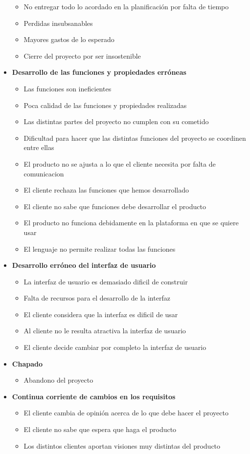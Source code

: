\documentclass[spanish,a4paper,12pt]{report}	%
\begin{document}
\begin{itemize}
\begin{itemize}
		\item {No entregar todo lo acordado en la planificación por falta de tiempo}
		\item {Perdidas insubsanables}
		\item {Mayores gastos de lo esperado}
		\item {Cierre del proyecto por ser insostenible}
	\end{itemize}
\item \textbf {Desarrollo de las funciones y propiedades erróneas}
	\begin{itemize}
		\item {Las funciones son ineficientes}
		\item {Poca calidad de las funciones y propiedades realizadas}
		\item {Las distintas partes del proyecto no cumplen con su cometido}
		\item {Dificultad para hacer que las distintas funciones del proyecto se coordinen entre ellas}
		\item {El producto no se ajusta a lo que el cliente necesita por falta de comunicacion}
		\item {El cliente rechaza las funciones que hemos desarrollado}
		\item {El cliente no sabe que funciones debe desarrollar el producto}
		\item {El producto no funciona debidamente en la plataforma en que se quiere usar}
		\item {El lenguaje no permite realizar todas las funciones}
	\end{itemize}
\item \textbf {Desarrollo erróneo del interfaz de usuario}
	\begin{itemize}
		\item {La interfaz de usuario es demasiado dificil de construir}
		\item {Falta de recursos para el desarrollo de la interfaz}
		\item {El cliente considera que la interfaz es dificil de usar}
		\item {Al cliente no le resulta atractiva la interfaz de usuario}
		\item {El cliente decide cambiar por completo la interfaz de usuario}
	\end{itemize}
\item \textbf {Chapado}
	\begin{itemize}
		\item {Abandono del proyecto}
	\end{itemize}
\item \textbf {Continua corriente de cambios en los requisitos}
	\begin{itemize}
		\item {El cliente cambia de opinión acerca de lo que debe hacer el proyecto}
		\item {El cliente no sabe que espera que haga el producto}
		\item {Los distintos clientes aportan visiones muy distintas del producto}


\end{itemize}
\end{itemize}
\end{document}
